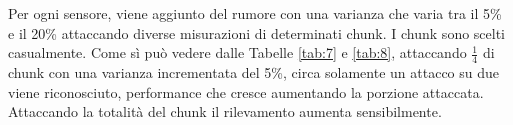 \documentclass[Lau,binding=0.6cm,noexaminfo]{sapthesis}
\begin{document}
Per ogni sensore, viene aggiunto del rumore con una varianza che varia tra il 5\% e il 20\% attaccando diverse misurazioni di determinati chunk. I chunk sono scelti casualmente.
Come sì pu\`o vedere dalle Tabelle \ref{tab:7} e \ref{tab:8}, attaccando $\frac{1}{4}$ di chunk con una varianza incrementata del 5\%, circa solamente un attacco su due viene riconosciuto, performance che cresce aumentando la porzione attaccata.
Attaccando la totalit\`a del chunk il rilevamento aumenta sensibilmente.

\begin{table}[b]
\end{table}
\end{document}
